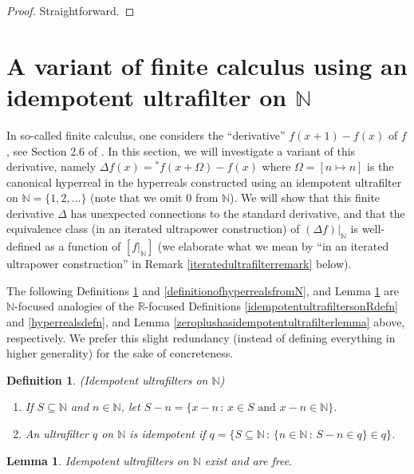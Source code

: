 \documentclass[microtype]{jloganal}
\newtheorem{lemma}[theorem]{Lemma}
\newtheorem{definition}[theorem]{Definition}
\begin{document}
\begin{proof}
    Straightforward.
\end{proof}

\section{A variant of finite calculus using an idempotent ultrafilter on $\mathbb N$}
\label{finitecalculussection}

In so-called finite calculus, one considers the ``derivative''
$f(x+1)-f(x)$ of $f$, see Section 2.6 of \cite{concrete}.
In this section, we will investigate a variant of this derivative,
namely $\Delta f(x)={}^*f(x+\Omega)-f(x)$ where $\Omega=[n\mapsto n]$
is the canonical hyperreal in the hyperreals constructed using
an idempotent ultrafilter on $\mathbb N=\{1,2,\ldots\}$ (note that we
omit $0$ from $\mathbb N$).
We will show that this finite derivative $\Delta$ has unexpected
connections to the standard derivative, and that the equivalence class
(in an iterated ultrapower construction) of
$(\Delta f)|_\mathbb N$ is well-defined as a function of
$[f|_\mathbb N]$ (we elaborate what we mean by ``in an iterated ultrapower
construction'' in Remark \ref{iteratedultrafilterremark} below).

The following Definitions \ref{idempotentultrafilteronNdefn}
and \ref{definitionofhyperrealsfromN},
and Lemma \ref{idempotentultrafiltersonNexist} are
$\mathbb N$-focused
analogies of the $\mathbb R$-focused
Definitions \ref{idempotentultrafiltersonRdefn}
and \ref{hyperrealsdefn}, and Lemma \ref{zeroplushasidempotentultrafilterlemma}
above, respectively. We prefer this slight redundancy (instead of defining
everything in higher generality) for the sake of concreteness.

\begin{definition}
\label{idempotentultrafilteronNdefn}
    (Idempotent ultrafilters on $\mathbb N$)
    \begin{enumerate}
        \item
        If $S\subseteq \mathbb N$ and $n\in\mathbb N$, let
        $S-n=\{x-n\,:\,\mbox{$x\in S$ and $x-n \in\mathbb N$}\}$.
        \item
        An ultrafilter $q$ on $\mathbb N$ is \emph{idempotent} if
        $q=\{S\subseteq \mathbb N\,:\, \{n\in\mathbb N\,:\,S-n\in q\}\in q\}$.
    \end{enumerate}
\end{definition}

\begin{lemma}
\label{idempotentultrafiltersonNexist}
    Idempotent ultrafilters on $\mathbb N$ exist and are free.
\end{lemma}
\end{document}
